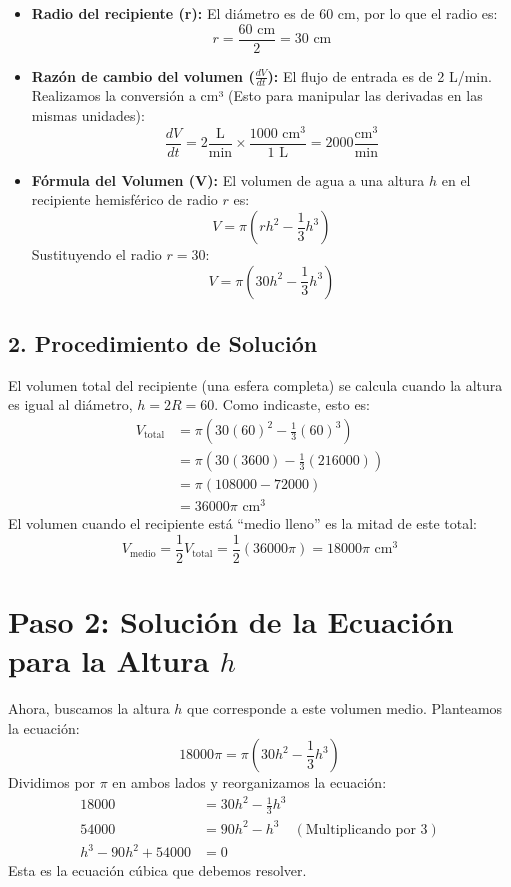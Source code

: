 \documentclass[12pt, letterpaper]{article}
\begin{document}
\begin{itemize}
    \item \textbf{Radio del recipiente (r):} El diámetro es de 60 cm, por lo que el radio es:
    $$r = \frac{60 \text{ cm}}{2} = 30 \text{ cm}$$

    \item \textbf{Razón de cambio del volumen ($\frac{dV}{dt}$):} El flujo de entrada es de 2 L/min. Realizamos la conversión a cm³ (Esto para manipular las derivadas en las mismas unidades):
    $$\frac{dV}{dt} = 2 \frac{\text{L}}{\text{min}} \times \frac{1000 \text{ cm}^3}{1 \text{ L}} = 2000 \frac{\text{cm}^3}{\text{min}}$$

    \item \textbf{Fórmula del Volumen (V):} El volumen de agua a una altura $h$ en el recipiente hemisférico de radio $r$ es:
    $$V = \pi \left(rh^2 - \frac{1}{3}h^3\right)$$
    Sustituyendo el radio $r=30$:
    $$V = \pi \left(30h^2 - \frac{1}{3}h^3\right)$$
\end{itemize}

\subsection*{2. Procedimiento de Solución}

El volumen total del recipiente (una esfera completa) se calcula cuando la altura es igual al diámetro, $h=2R=60$. Como indicaste, esto es:
\begin{align*}
    V_{\text{total}} &= \pi \left( 30(60)^2 - \frac{1}{3}(60)^3 \right) \\
    &= \pi \left( 30(3600) - \frac{1}{3}(216000) \right) \\
    &= \pi (108000 - 72000) \\
    &= 36000\pi \text{ cm}^3
\end{align*}
El volumen cuando el recipiente está ``medio lleno'' es la mitad de este total:
$$ V_{\text{medio}} = \frac{1}{2} V_{\text{total}} = \frac{1}{2}(36000\pi) = 18000\pi \text{ cm}^3 $$

\section*{Paso 2: Solución de la Ecuación para la Altura $h$}

Ahora, buscamos la altura $h$ que corresponde a este volumen medio. Planteamos la ecuación:
$$ 18000\pi = \pi \left( 30h^2 - \frac{1}{3}h^3 \right) $$
Dividimos por $\pi$ en ambos lados y reorganizamos la ecuación:
\begin{align*}
    18000 &= 30h^2 - \frac{1}{3}h^3 \\
    54000 &= 90h^2 - h^3 \quad (\text{Multiplicando por 3}) \\
    h^3 - 90h^2 + 54000 &= 0
\end{align*}
Esta es la ecuación cúbica que debemos resolver.
\end{document}
